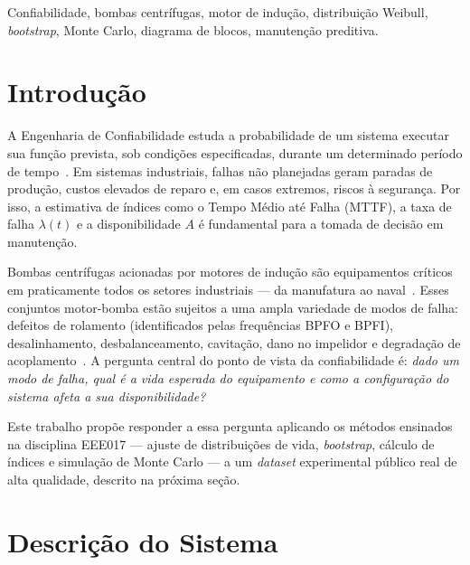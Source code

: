 \documentclass[conference]{IEEEtran}
\begin{document}
\begin{IEEEkeywords}
Confiabilidade, bombas centrífugas, motor de indução, distribuição
Weibull, \textit{bootstrap}, Monte Carlo, diagrama de blocos,
manutenção preditiva.
\end{IEEEkeywords}

\section{Introdução}

A Engenharia de Confiabilidade estuda a probabilidade de um sistema
executar sua função prevista, sob condições especificadas, durante um
determinado período de tempo~\cite{oconnor2012}. Em sistemas industriais,
falhas não planejadas geram paradas de produção, custos elevados de
reparo e, em casos extremos, riscos à segurança. Por isso, a estimativa
de índices como o Tempo Médio até Falha (MTTF), a taxa de falha
$\lambda(t)$ e a disponibilidade $A$ é fundamental para a tomada de
decisão em manutenção.

Bombas centrífugas acionadas por motores de indução são equipamentos
críticos em praticamente todos os setores industriais --- da manufatura
ao naval~\cite{bruinsma2024}. Esses conjuntos motor-bomba estão sujeitos
a uma ampla variedade de modos de falha: defeitos de rolamento
(identificados pelas frequências BPFO e BPFI), desalinhamento, 
desbalanceamento, cavitação, dano no impelidor e degradação de
acoplamento~\cite{bruinsma2024}. A pergunta central do ponto de vista
da confiabilidade é: \textit{dado um modo de falha, qual é a vida
esperada do equipamento e como a configuração do sistema afeta a sua
disponibilidade?}

Este trabalho propõe responder a essa pergunta aplicando os métodos
ensinados na disciplina EEE017 --- ajuste de distribuições de vida,
\textit{bootstrap}, cálculo de índices e simulação de Monte Carlo --- a um
\textit{dataset} experimental público real de alta qualidade, descrito na
próxima seção.

\section{Descrição do Sistema}
\end{document}
